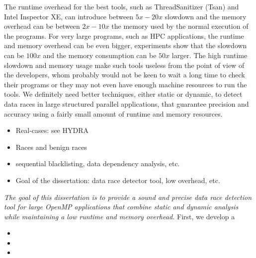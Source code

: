 The runtime overhead for the best tools, such as ThreadSanitizer (Tsan) and
Intel Inspector XE, can introduce between $5x-20x$ slowdown and the memory
overhead can be between $2x-10x$ the memory used by the normal execution of
the programs.
%
For very large programs, such as HPC applications, the runtime and memory
overhead can be even bigger, experiments show that the slowdown can be $100x$
and the memory consumption can be $50x$ larger.
%
The high runtime slowdown and memory usage make such tools useless from the
point of view of the developers, whom probably would not be keen to wait a
long time to check their programs or they may not even have enough machine
resources to run the tools.
%
We definitely need better techniques, either static or dynamic, to detect data
races in large structured parallel applications, that guarantee precision and
accuracy using a fairly small amount of runtime and memory resources.

\begin{itemize}
  \item Real-cases: see HYDRA
  \item Races and benign races
  \item sequential blacklisting, data dependency analysis, etc.
  \item Goal of the dissertation: data race detector tool, low overhead, etc.
\end{itemize}

\emph{The goal of this dissertation is to provide a sound and precise data
  race detection tool for large OpenMP applications that combine static and
  dynamic analysis while maintaining a low runtime and memory overhead.}
%
First, we develop a

\begin{itemize}
\item
\item 
\item 
\end{itemize}

